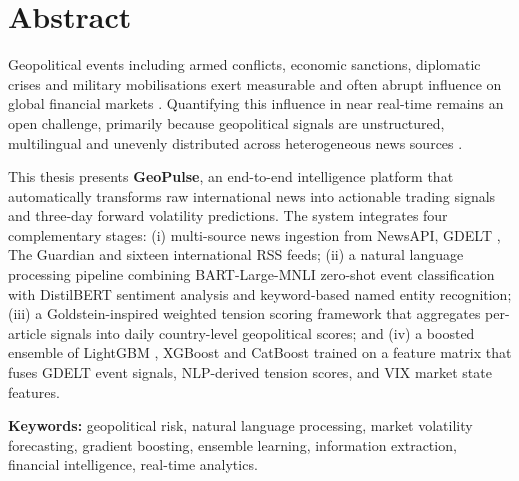 \documentclass[12pt,a4paper]{report}
\begin{document}





\tableofcontents


\newpage
\chapter*{Abstract}

Geopolitical events including armed conflicts, economic sanctions, diplomatic
crises and military mobilisations exert measurable and often abrupt influence
on global financial markets \cite{caldara2022}. Quantifying this influence in
near real-time remains an open challenge, primarily because geopolitical
signals are unstructured, multilingual and unevenly distributed across
heterogeneous news sources \cite{nassirtoussi2014}.

This thesis presents \textbf{GeoPulse}, an end-to-end intelligence platform
that automatically transforms raw international news into actionable trading
signals and three-day forward volatility predictions. The system integrates
four complementary stages: (i) multi-source news ingestion from NewsAPI,
GDELT \cite{leetaru2013}, The Guardian and sixteen international RSS feeds;
(ii) a natural language processing pipeline combining BART-Large-MNLI
\cite{lewis2020} zero-shot event classification with DistilBERT sentiment
analysis \cite{devlin2019} and keyword-based named entity recognition;
(iii) a Goldstein-inspired weighted tension scoring framework \cite{goldstein1992}
that aggregates per-article signals into daily country-level geopolitical
scores; and (iv) a boosted ensemble of LightGBM \cite{ke2017}, XGBoost
\cite{chen2016} and CatBoost \cite{prokhorenkova2018} trained on a feature
matrix that fuses GDELT event signals, NLP-derived tension scores, and VIX
market state features.

\vspace{0.5cm}
\noindent\textbf{Keywords:} geopolitical risk, natural language processing,
market volatility forecasting, gradient boosting, ensemble learning,
information extraction, financial intelligence, real-time analytics.
\end{document}
